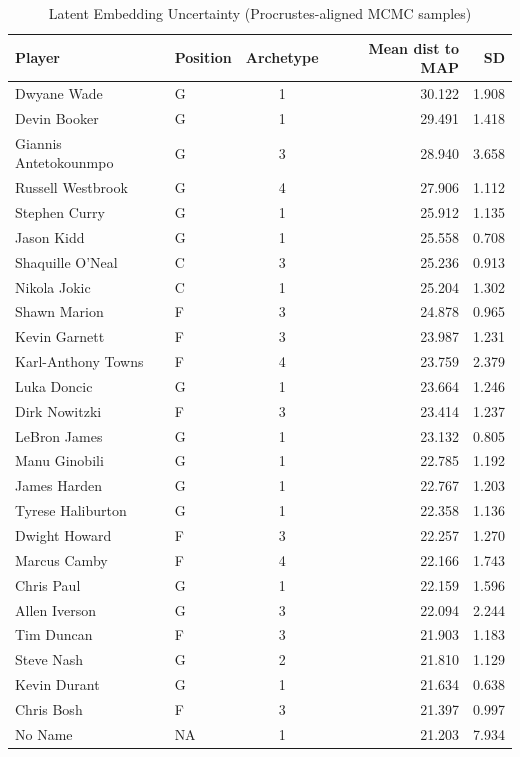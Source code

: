 \begin{table}[t]
\caption*{
{\fontsize{20}{25}\selectfont  Latent Embedding Uncertainty (Procrustes-aligned MCMC samples)\fontsize{12}{15}\selectfont }
} 
\fontsize{12.0pt}{14.0pt}\selectfont
\begin{tabular*}{\linewidth}{@{\extracolsep{\fill}}llcrr}
\toprule
Player & Position & Archetype & Mean dist to MAP & SD \\ 
\midrule\addlinespace[2.5pt]
Dwyane Wade & G & 1 & 30.122 & 1.908 \\ 
Devin Booker & G & 1 & 29.491 & 1.418 \\ 
Giannis Antetokounmpo & G & 3 & 28.940 & 3.658 \\ 
Russell Westbrook & G & 4 & 27.906 & 1.112 \\ 
Stephen Curry & G & 1 & 25.912 & 1.135 \\ 
Jason Kidd & G & 1 & 25.558 & 0.708 \\ 
Shaquille O'Neal & C & 3 & 25.236 & 0.913 \\ 
Nikola Jokic & C & 1 & 25.204 & 1.302 \\ 
Shawn Marion & F & 3 & 24.878 & 0.965 \\ 
Kevin Garnett & F & 3 & 23.987 & 1.231 \\ 
Karl-Anthony Towns & F & 4 & 23.759 & 2.379 \\ 
Luka Doncic & G & 1 & 23.664 & 1.246 \\ 
Dirk Nowitzki & F & 3 & 23.414 & 1.237 \\ 
LeBron James & G & 1 & 23.132 & 0.805 \\ 
Manu Ginobili & G & 1 & 22.785 & 1.192 \\ 
James Harden & G & 1 & 22.767 & 1.203 \\ 
Tyrese Haliburton & G & 1 & 22.358 & 1.136 \\ 
Dwight Howard & F & 3 & 22.257 & 1.270 \\ 
Marcus Camby & F & 4 & 22.166 & 1.743 \\ 
Chris Paul & G & 1 & 22.159 & 1.596 \\ 
Allen Iverson & G & 3 & 22.094 & 2.244 \\ 
Tim Duncan & F & 3 & 21.903 & 1.183 \\ 
Steve Nash & G & 2 & 21.810 & 1.129 \\ 
Kevin Durant & G & 1 & 21.634 & 0.638 \\ 
Chris Bosh & F & 3 & 21.397 & 0.997 \\ 
No Name & NA & 1 & 21.203 & 7.934 \\ 

\end{tabular*}
\end{table}
